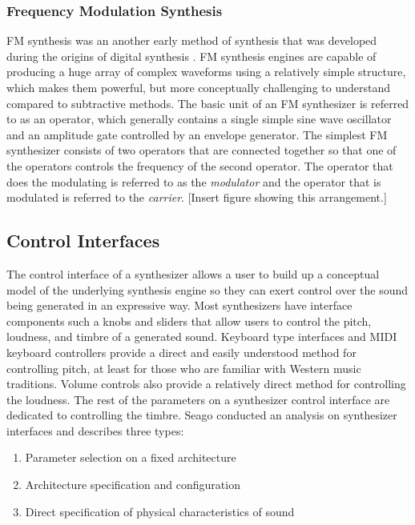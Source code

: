 \subsubsection{Frequency Modulation Synthesis}
FM synthesis was an another early method of synthesis that was developed during the origins of digital synthesis \cite{chowning1973synthesis}. FM synthesis engines are capable of producing a huge array of complex waveforms using a relatively simple structure, which makes them powerful, but more conceptually challenging to understand compared to subtractive methods. The basic unit of an FM synthesizer is referred to as an operator, which generally contains a single simple sine wave oscillator and an amplitude gate controlled by an envelope generator. The simplest FM synthesizer consists of two operators that are connected together so that one of the operators controls the frequency of the second operator. The operator that does the modulating is referred to as the \textit{modulator} and the operator that is modulated is referred to the \textit{carrier}. [Insert figure showing this arrangement.]


\subsection{Control Interfaces}
\label{sec:control_interfaces}

The control interface of a synthesizer allows a user to build up a conceptual model of the underlying synthesis engine so they can exert control over the sound being generated in an expressive way. Most synthesizers have interface components such a knobs and sliders that allow users to control the pitch, loudness, and timbre of a generated sound. Keyboard type interfaces and MIDI keyboard controllers provide a direct and easily understood method for controlling pitch, at least for those who are familiar with Western music traditions. Volume controls also provide a relatively direct method for controlling the loudness. The rest of the parameters on a synthesizer control interface are dedicated to controlling the timbre. Seago \cite{seago2004critical} conducted an analysis on synthesizer interfaces and describes three types:
\begin{enumerate}
    \item Parameter selection on a fixed architecture
    \item Architecture specification and configuration
    \item Direct specification of physical characteristics of sound
\end{enumerate}

